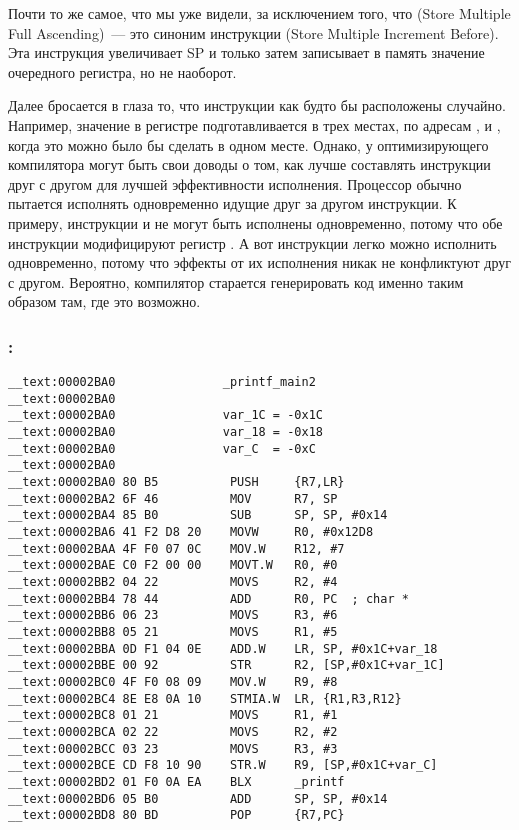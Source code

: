 Почти то же самое, что мы уже видели, за исключением того, что  (Store Multiple Full Ascending)~--- 
это синоним инструкции  (Store Multiple Increment Before). 
Эта инструкция увеличивает \ac{SP} и только затем записывает в память значение очередного регистра, но не наоборот.

Далее бросается в глаза то, что инструкции как будто бы расположены случайно.
Например, значение в регистре  подготавливается в трех местах, по адресам ,  и , 
когда это можно было бы сделать в одном месте.
Однако, у оптимизирующего компилятора могут быть свои доводы о том, как лучше составлять инструкции 
друг с другом для лучшей эффективности исполнения.
Процессор обычно пытается исполнять одновременно идущие друг за другом инструкции.
К примеру, инструкции  и  не могут быть исполнены одновременно,
потому что обе инструкции модифицируют регистр . 
А вот инструкции  \AndENRU {} легко можно исполнить одновременно, 
потому что эффекты от их исполнения никак не конфликтуют друг с другом.
Вероятно, компилятор старается генерировать код именно таким образом там, где это возможно.
 
\subsubsection{\OptimizingXcodeIV: \ThumbTwoMode}

\begin{lstlisting}
__text:00002BA0               _printf_main2
__text:00002BA0
__text:00002BA0               var_1C = -0x1C
__text:00002BA0               var_18 = -0x18
__text:00002BA0               var_C  = -0xC
__text:00002BA0
__text:00002BA0 80 B5          PUSH     {R7,LR}
__text:00002BA2 6F 46          MOV      R7, SP
__text:00002BA4 85 B0          SUB      SP, SP, #0x14
__text:00002BA6 41 F2 D8 20    MOVW     R0, #0x12D8
__text:00002BAA 4F F0 07 0C    MOV.W    R12, #7
__text:00002BAE C0 F2 00 00    MOVT.W   R0, #0
__text:00002BB2 04 22          MOVS     R2, #4
__text:00002BB4 78 44          ADD      R0, PC  ; char *
__text:00002BB6 06 23          MOVS     R3, #6
__text:00002BB8 05 21          MOVS     R1, #5
__text:00002BBA 0D F1 04 0E    ADD.W    LR, SP, #0x1C+var_18
__text:00002BBE 00 92          STR      R2, [SP,#0x1C+var_1C]
__text:00002BC0 4F F0 08 09    MOV.W    R9, #8
__text:00002BC4 8E E8 0A 10    STMIA.W  LR, {R1,R3,R12}
__text:00002BC8 01 21          MOVS     R1, #1
__text:00002BCA 02 22          MOVS     R2, #2
__text:00002BCC 03 23          MOVS     R3, #3
__text:00002BCE CD F8 10 90    STR.W    R9, [SP,#0x1C+var_C]
__text:00002BD2 01 F0 0A EA    BLX      _printf
__text:00002BD6 05 B0          ADD      SP, SP, #0x14
__text:00002BD8 80 BD          POP      {R7,PC}
\end{lstlisting}


